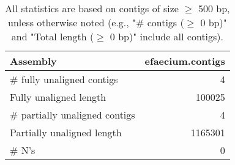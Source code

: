\documentclass[12pt,a4paper]{article}
\begin{document}
\begin{table}[ht]
\begin{center}
\caption{All statistics are based on contigs of size $\geq$ 500 bp, unless otherwise noted (e.g., "\# contigs ($\geq$ 0 bp)" and "Total length ($\geq$ 0 bp)" include all contigs).}
\begin{tabular}{|l*{1}{|r}|}
\hline
Assembly & efaecium.contigs \\ \hline
\# fully unaligned contigs & 4 \\ \hline
Fully unaligned length & 100025 \\ \hline
\# partially unaligned contigs & 4 \\ \hline
Partially unaligned length & 1165301 \\ \hline
\# N's & 0 \\ \hline
\end{tabular}
\end{center}
\end{table}
\end{document}
